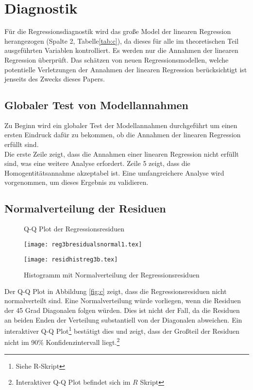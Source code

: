 \documentclass[11pt,a4paper]{article}
\begin{document}
\section{Diagnostik}
Für die Regressionsdiagnostik wird das große Model der linearen Regression herangezogen (Spalte 2, Tabelle\ref{tab:c}), da dieses für alle im theoretischen Teil ausgeführten Variablen kontrolliert. Es werden nur die Annahmen der linearen Regression überprüft. Das schätzen von neuen Regressionsmodellen, welche potentielle Verletzungen der Annahmen der linearen Regression berücksichtigt ist jenseits des Zwecks dieses Papers. 
 
\subsection{Globaler Test von Modellannahmen}

Zu Beginn wird ein globaler Test der Modellannahmen durchgeführt um einen ersten Eindruck dafür zu bekommen, ob die Annahmen der linearen Regression erfüllt sind.\\ 

Die erste Zeile zeigt, dass die Annahmen einer linearen Regression nicht erfüllt sind, was eine weitere Analyse erfordert. 
Zeile 5 zeigt, dass die Homogentitätsannahme akzeptabel ist. Eine umfangreichere Analyse wird vorgenommen, um dieses Ergebnis zu validieren. 

\subsection{Normalverteilung der Residuen}

\begin{figure}
    \centering
    \begin{minipage}{0.45\textwidth}
\caption{Q-Q Plot der Regressionsresiduen}\label{fig:c}
        \texttt{[image: reg3bresidualsnormal1.tex]} %
        
    \end{minipage}\hfill
    \begin{minipage}{0.45\textwidth}
\caption{Histogramm mit Normalverteilung der Regressionsresiduen}\label{fig:d}
        \texttt{[image: residhistreg3b.tex]} %
        
    \end{minipage}
\end{figure}

Der Q-Q Plot in Abbildung \ref{fig:c} zeigt, dass die Regressionsresiduen nicht normalverteilt sind. Eine Normalverteilung würde vorliegen, wenn die Residuen der 45 Grad Diagonalen folgen würden. Dies ist nicht der Fall, da die Residuen an beiden Enden der Verteilung substantiell von der Diagonalen abweichen. Ein interaktiver Q-Q Plot\footnote{Siehe R-Skript} bestätigt dies und zeigt, dass der Großteil der Residuen nicht im 90\% Konfidenzintervall liegt.\footnote{Interaktiver Q-Q Plot befindet sich im $R$ Skript}\\
\end{document}
